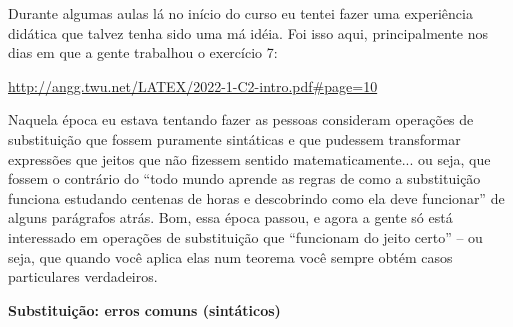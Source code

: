 \documentclass[oneside,12pt]{article}
\begin{document}
{{  \msk

  Durante algumas aulas lá no início do curso eu tentei fazer uma
  experiência didática que talvez tenha sido uma má idéia. Foi isso
  aqui, principalmente nos dias em que a gente trabalhou o exercício
  7:

  \ssk

  {\footnotesize

  \url{http://angg.twu.net/LATEX/2022-1-C2-intro.pdf\#page=10}

  }

  \ssk

  Naquela época eu estava tentando fazer as pessoas consideram
  operações de substituição que fossem puramente sintáticas e que
  pudessem transformar expressões que jeitos que não fizessem sentido
  matematicamente... ou seja, que fossem o contrário do ``todo mundo
  aprende as regras de como a substituição funciona estudando centenas
  de horas e descobrindo como ela deve funcionar'' de alguns
  parágrafos atrás. Bom, essa época passou, e agora a gente só está
  interessado em operações de substituição que ``funcionam do jeito
  certo'' -- ou seja, que quando você aplica elas num teorema você
  sempre obtém casos particulares verdadeiros.

}}



\newpage


{\bf Substituição: erros comuns (sintáticos)}
\end{document}
